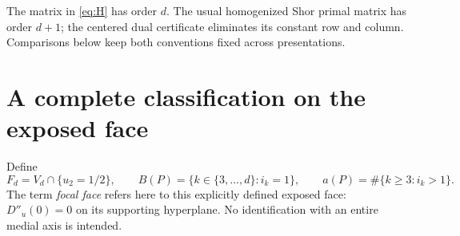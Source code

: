 \documentclass[11pt]{article}
\theoremstyle{definition}\newtheorem{definition}[theorem]{Definition}
\theoremstyle{remark}\newtheorem{remark}[theorem]{Remark}
\begin{document}
The matrix in \eqref{eq:H} has order $d$. The usual homogenized Shor primal matrix has order $d+1$; the centered dual certificate eliminates its constant row and column. Comparisons below keep both conventions fixed across presentations.

\section{A complete classification on the exposed face}\label{sec:main}
Define
\begin{equation}
 F_d=V_d\cap\{u_2=1/2\},\qquad
 B(P)=\{k\in\{3,\ldots,d\}:i_k=1\},\qquad
 a(P)=\#\{k\ge3:i_k>1\}.
\end{equation}
The term \emph{focal face} refers here to this explicitly defined exposed face: $D''_u(0)=0$ on its supporting hyperplane. No identification with an entire medial axis is intended.
\end{document}
